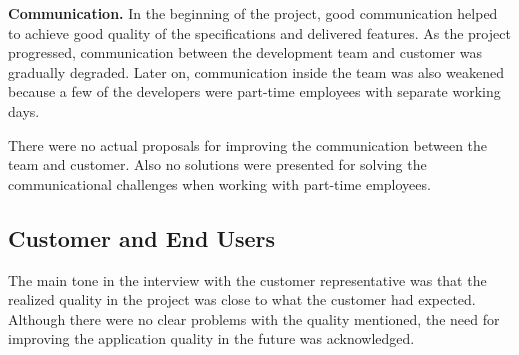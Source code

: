 \textbf{Communication.} In the beginning of the project, good communication helped to achieve good quality of the specifications and delivered features. As the project progressed, communication between the development team and customer was gradually degraded. Later on, communication inside the team was also weakened because a few of the developers were part-time employees with separate working days.

There were no actual proposals for improving the communication between the team and customer. Also no solutions were presented for solving the communicational challenges when working with part-time employees.

















% 





% 




\subsection{Customer and End Users}

The main tone in the interview with the customer representative was that the realized quality in the project was close to what the customer had expected. 
Although there were no clear problems with the quality mentioned, the need for improving the application quality in the future was acknowledged.

